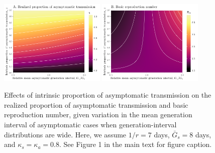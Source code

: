 \documentclass[12pt]{article}
\begin{document}
\begin{figure}[!ht]
\begin{center}
\includegraphics[width=0.45\textwidth]{../figheatmap_08.pdf}
\mbox{\hspace{0.05\textwidth}}
\includegraphics[width=0.45\textwidth]{../figheatmap_R0_08.pdf}
\caption{Effects of intrinsic proportion of asymptomatic transmission on the realized proportion of asymptomatic transmission and basic reproduction number, given variation in
the mean generation interval of asymptomatic cases when generation-interval distributions are wide. 
Here, we assume $1/r=7$ days, $\bar G_s=8$ days, and $\kappa_s=\kappa_a=0.8$.
See Figure 1 in the main text for figure caption.
}
\end{center}
\end{figure}

\pagebreak
\end{document}
